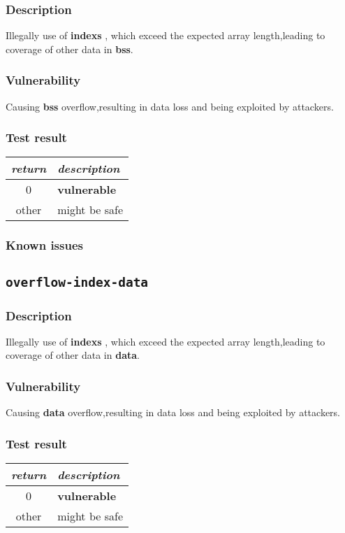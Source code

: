 \documentclass[a4paper]{book}
\begin{document}
\subsubsection{Description}
Illegally use of \textbf{indexs} , which exceed the expected array length,leading to coverage of other data in \textbf{bss}.\subsubsection{Vulnerability}
Causing \textbf{bss} overflow,resulting in data loss and being exploited by attackers.
\subsubsection{Test result}
\begin{tabular}{cl}
  \toprule
  \emph{return}  & \emph{description} \\
  \midrule
  0              & \textbf{vulnerable} \\
  other          & might be safe \\
  \bottomrule
\end{tabular}
\subsubsection{Known issues}

\newpage

\subsection{\texttt{overflow-index-data}}\label{test-overflow-index-data}
\subsubsection{Description}
Illegally use of \textbf{indexs} , which exceed the expected array length,leading to coverage of other data in \textbf{data}.\subsubsection{Vulnerability}
Causing \textbf{data} overflow,resulting in data loss and being exploited by attackers.
\subsubsection{Test result}
\begin{tabular}{cl}
  \toprule
  \emph{return}  & \emph{description} \\
  \midrule
  0              & \textbf{vulnerable} \\
  other          & might be safe \\
  \bottomrule
\end{tabular}
\end{document}
